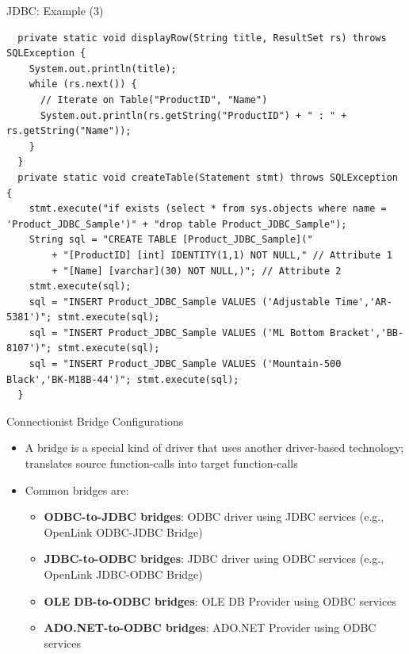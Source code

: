 \documentclass[aspectratio=169, xcolor=dvipsnames]{beamer}
\begin{document}
\begin{frame}[fragile]{JDBC: Example (3)}
    \begin{verbatim}
  private static void displayRow(String title, ResultSet rs) throws SQLException {
    System.out.println(title);
    while (rs.next()) {
      // Iterate on Table("ProductID", "Name")
      System.out.println(rs.getString("ProductID") + " : " + rs.getString("Name"));
    }
  }
  private static void createTable(Statement stmt) throws SQLException {
    stmt.execute("if exists (select * from sys.objects where name = 'Product_JDBC_Sample')" + "drop table Product_JDBC_Sample");
    String sql = "CREATE TABLE [Product_JDBC_Sample]("
        + "[ProductID] [int] IDENTITY(1,1) NOT NULL," // Attribute 1
        + "[Name] [varchar](30) NOT NULL,)"; // Attribute 2
    stmt.execute(sql);
    sql = "INSERT Product_JDBC_Sample VALUES ('Adjustable Time','AR-5381')"; stmt.execute(sql);
    sql = "INSERT Product_JDBC_Sample VALUES ('ML Bottom Bracket','BB-8107')"; stmt.execute(sql);
    sql = "INSERT Product_JDBC_Sample VALUES ('Mountain-500 Black','BK-M18B-44')"; stmt.execute(sql);
  }
    \end{verbatim}
\end{frame}

\begin{frame}{Connectionist Bridge Configurations}
    \begin{itemize}[<+->]
        \item A bridge is a special kind of driver that uses another driver-based technology; translates source function-calls into target function-calls
        \item Common bridges are:
        \begin{itemize}
            \item[$\triangleright$] \textbf{ODBC-to-JDBC bridges}: ODBC driver using JDBC services (e.g., OpenLink ODBC-JDBC Bridge)
            \item[$\triangleright$] \textbf{JDBC-to-ODBC bridges}: JDBC driver using ODBC services (e.g., OpenLink JDBC-ODBC Bridge)
            \item[$\triangleright$] \textbf{OLE DB-to-ODBC bridges}: OLE DB Provider using ODBC services
            \item[$\triangleright$] \textbf{ADO.NET-to-ODBC bridges}: ADO.NET Provider using ODBC services
        \end{itemize}
    \end{itemize}
\end{frame}
\end{document}
